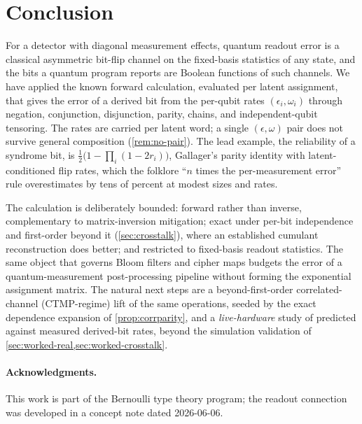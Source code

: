 \documentclass[11pt]{article}
\numberwithin{equation}{section}
\theoremstyle{plain}
\theoremstyle{definition}
\theoremstyle{remark}
\newcommand{\eps}{\epsilon}
\begin{document}
\section{Conclusion}
\label{sec:conclusion}

For a detector with diagonal measurement effects, quantum readout error is a
classical asymmetric bit-flip channel on the fixed-basis statistics of any
state, and the bits a quantum program reports are Boolean functions of such
channels. We have applied the known forward calculation, evaluated per latent
assignment, that gives the error of a derived bit from the per-qubit rates
$(\eps_i,\omega_i)$ through negation, conjunction, disjunction, parity, chains,
and independent-qubit tensoring. The rates are carried per latent word; a
single $(\eps,\omega)$ pair does not survive general composition
(\cref{rem:no-pair}). The lead example, the reliability of a syndrome bit, is
$\tfrac12\bigl(1-\prod_i(1-2r_i)\bigr)$, Gallager's parity identity with
latent-conditioned flip rates, which the folklore ``$n$ times the
per-measurement error'' rule overestimates by tens of percent at modest sizes
and rates.

The calculation is deliberately bounded: forward rather than inverse,
complementary to matrix-inversion mitigation; exact under per-bit independence
and first-order beyond it (\cref{sec:crosstalk}), where an established cumulant
reconstruction does better; and restricted to fixed-basis readout statistics.
The same object that governs Bloom filters and cipher maps budgets the error of
a quantum-measurement post-processing pipeline without forming the exponential
assignment matrix. The natural next steps are a
beyond-first-order correlated-channel (CTMP-regime) lift of the same
operations, seeded by the exact dependence expansion of \cref{prop:corrparity},
and a \emph{live-hardware} study of predicted against measured derived-bit
rates, beyond the simulation validation of
\cref{sec:worked-real,sec:worked-crosstalk}.

\paragraph{Acknowledgments.} This work is part of the Bernoulli type theory
program; the readout connection was developed in a concept note dated 2026-06-06.


\end{document}
